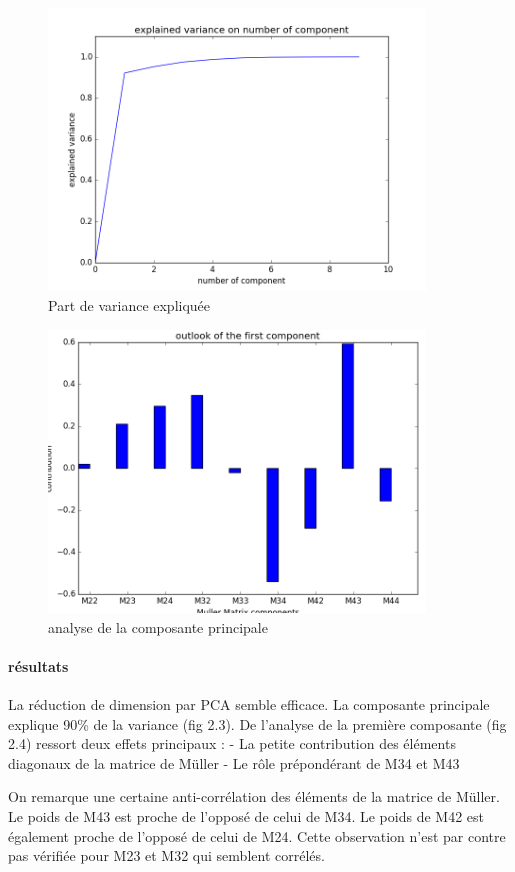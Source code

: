 \documentclass[a4paper,10pt]{report}
\begin{document}
\begin{figure}
  \caption{Part de variance expliquée}
  \centering
  \includegraphics[width=10cm]{PCA_3.png}
\end{figure}
\begin{figure}
  \caption{analyse de la composante principale}
  \centering
  \includegraphics[width=10cm]{PCA_2.png}
\end{figure}

\paragraph{résultats}
La réduction de dimension par PCA semble efficace. La composante principale explique 90\% de la variance (fig 2.3). 
De l'analyse de la première composante (fig 2.4) ressort deux effets principaux :
- La petite contribution des éléments diagonaux de la matrice de Müller
- Le rôle prépondérant de M34 et M43

On remarque une certaine anti-corrélation des éléments de la matrice de Müller. Le poids de M43 est proche de l'opposé de celui de M34. Le poids de M42 est également proche de l'opposé de celui de M24. Cette observation n'est par contre pas vérifiée pour M23 et M32 qui semblent corrélés.
\end{document}
